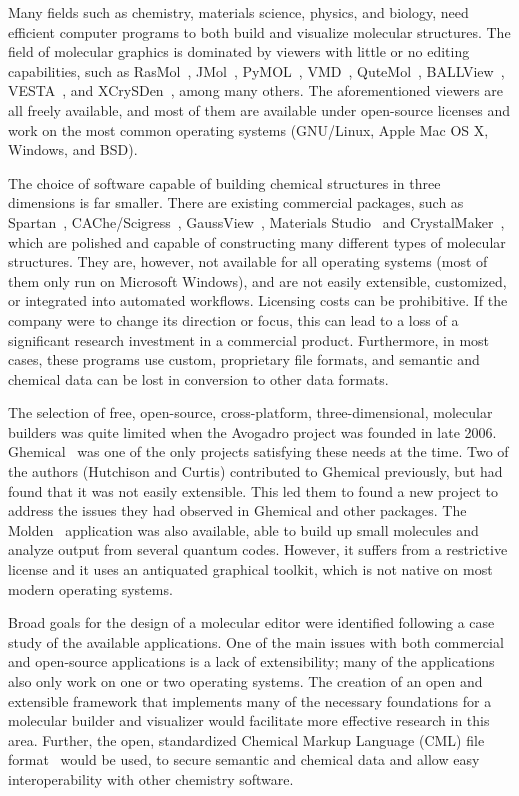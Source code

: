 \documentclass[10pt]{bmc_article}
\newenvironment{bmcformat}{\begin{raggedright}
\baselineskip20pt\sloppy\setboolean{publ}{false}}{\end{raggedright}
\baselineskip20pt\sloppy}
\begin{document}
\begin{bmcformat}
Many fields such as chemistry, materials science, physics, and biology, need
efficient computer programs to both build and visualize molecular structures.
The field of molecular graphics is dominated by viewers with little or no
editing capabilities, such as RasMol~\cite{RasMol}, JMol~\cite{JMol},
PyMOL~\cite{PyMOL}, VMD~\cite{VMD}, QuteMol~\cite{QuteMol},
BALLView~\cite{BALLView}, VESTA~\cite{vesta3}, and
XCrySDen~\cite{xcrysden1}\cite{xcrysden2}, among many others. The aforementioned
viewers are all freely available, and most of them are available under
open-source licenses and work on the most common operating systems
(GNU/Linux, Apple Mac OS X, Windows, and BSD).

The choice of software capable of building chemical structures in
three dimensions is far smaller.
There are existing commercial packages, such as
Spartan~\cite{Spartan}, CAChe/Scigress~\cite{CAChe},
GaussView~\cite{GaussView}, Materials Studio~\cite{Accelrys} and
CrystalMaker~\cite{CrystalMaker}, which are polished and capable of
constructing many different types of molecular structures. They are,
however, not available for all operating systems (most of them only
run on Microsoft Windows), and are not easily extensible, customized,
or integrated into automated workflows. Licensing costs can be
prohibitive. If the company were to change its direction or focus, this
can lead to a loss of a significant research investment in a commercial
product. Furthermore, in most cases, these programs use custom,
proprietary file formats, and semantic and chemical data can be lost in
conversion to other data formats.

The selection of free, open-source, cross-platform, three-dimensional,
molecular builders was quite limited when the Avogadro project was founded in late 2006.
Ghemical~\cite{Ghemical} was one of the only projects satisfying these needs at
the time. Two of the authors (Hutchison and Curtis) contributed to Ghemical
previously, but had found that it was not easily extensible. This led them to
found a new project to address the issues they had observed in Ghemical
and other packages. The Molden~\cite{Molden} application was also available,
able to build up small molecules and analyze output from several quantum codes.
However, it suffers from a restrictive license and it uses an antiquated graphical
toolkit, which is not native on most modern operating systems.

Broad goals for the design of a molecular editor were identified following a
case study of the available applications. One of the main issues with both
commercial and open-source applications is a lack of extensibility; many of the
applications also only work on one or two operating systems. The
creation of an open and extensible framework that implements many of the necessary foundations
for a molecular builder and visualizer would facilitate more effective research
in this area. Further, the open, standardized Chemical Markup Language
(CML) file format~\cite{CML2011a, CML2011b} would be used, to secure
semantic and chemical data and allow easy interoperability with other
chemistry software.


\end{bmcformat}
\end{document}
